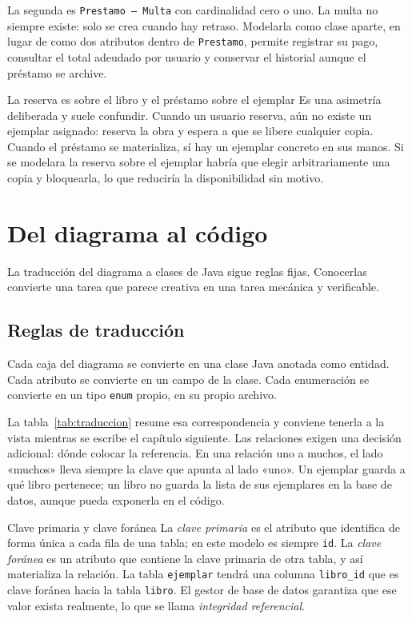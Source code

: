 \documentclass[11pt,a4paper,openany]{book}
\begin{document}
La segunda es \texttt{Prestamo --- Multa} con cardinalidad cero o uno. La multa no siempre existe: solo se crea cuando hay retraso. Modelarla como clase aparte, en lugar de como dos atributos dentro de \texttt{Prestamo}, permite registrar su pago, consultar el total adeudado por usuario y conservar el historial aunque el préstamo se archive.

\begin{cajaadvertencia}{La reserva es sobre el libro y el préstamo sobre el ejemplar}
	Es una asimetría deliberada y suele confundir. Cuando un usuario reserva, aún no existe un ejemplar asignado: reserva la obra y espera a que se libere cualquier copia. Cuando el préstamo se materializa, sí hay un ejemplar concreto en sus manos. Si se modelara la reserva sobre el ejemplar habría que elegir arbitrariamente una copia y bloquearla, lo que reduciría la disponibilidad sin motivo.
\end{cajaadvertencia}

\section{Del diagrama al código}
\label{sec:diagrama-codigo}

La traducción del diagrama a clases de Java sigue reglas fijas. Conocerlas convierte una tarea que parece creativa en una tarea mecánica y verificable.

\subsection{Reglas de traducción}
\label{sec:reglas-traduccion}

Cada caja del diagrama se convierte en una clase Java anotada como entidad. Cada atributo se convierte en un campo de la clase. Cada enumeración se convierte en un tipo \texttt{enum} propio, en su propio archivo.

La tabla~\ref{tab:traduccion} resume esa correspondencia y conviene tenerla a la vista mientras se escribe el capítulo siguiente. Las relaciones exigen una decisión adicional: dónde colocar la referencia. En una relación uno a muchos, el lado «muchos» lleva siempre la clave que apunta al lado «uno». Un ejemplar guarda a qué libro pertenece; un libro no guarda la lista de sus ejemplares en la base de datos, aunque pueda exponerla en el código.

\begin{cajadefinicion}{Clave primaria y clave foránea}
	La \emph{clave primaria} es el atributo que identifica de forma única a cada fila de una tabla; en este modelo es siempre \texttt{id}. La \emph{clave foránea} es un atributo que contiene la clave primaria de otra tabla, y así materializa la relación. La tabla \texttt{ejemplar} tendrá una columna \texttt{libro\_id} que es clave foránea hacia la tabla \texttt{libro}. El gestor de base de datos garantiza que ese valor exista realmente, lo que se llama \emph{integridad referencial}.
\end{cajadefinicion}
\end{document}
